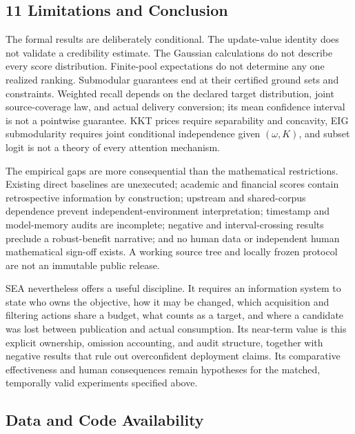 \documentclass[
  11pt]{article}
\begin{document}
\subsection{11 Limitations and
Conclusion}\label{limitations-and-conclusion}

The formal results are deliberately conditional. The update-value
identity does not validate a credibility estimate. The Gaussian
calculations do not describe every score distribution. Finite-pool
expectations do not determine any one realized ranking. Submodular
guarantees end at their certified ground sets and constraints. Weighted
recall depends on the declared target distribution, joint
source-coverage law, and actual delivery conversion; its mean confidence
interval is not a pointwise guarantee. KKT prices require separability
and concavity, EIG submodularity requires joint conditional independence
given \((\omega,K)\), and subset logit is not a theory of every
attention mechanism.

The empirical gaps are more consequential than the mathematical
restrictions. Existing direct baselines are unexecuted; academic and
financial scores contain retrospective information by construction;
upstream and shared-corpus dependence prevent independent-environment
interpretation; timestamp and model-memory audits are incomplete;
negative and interval-crossing results preclude a robust-benefit
narrative; and no human data or independent human mathematical sign-off
exists. A working source tree and locally frozen protocol are not an
immutable public release.

SEA nevertheless offers a useful discipline. It requires an information
system to state who owns the objective, how it may be changed, which
acquisition and filtering actions share a budget, what counts as a
target, and where a candidate was lost between publication and actual
consumption. Its near-term value is this explicit ownership, omission
accounting, and audit structure, together with negative results that
rule out overconfident deployment claims. Its comparative effectiveness
and human consequences remain hypotheses for the matched, temporally
valid experiments specified above.

\subsection{Data and Code
Availability}\label{data-and-code-availability}
\end{document}
